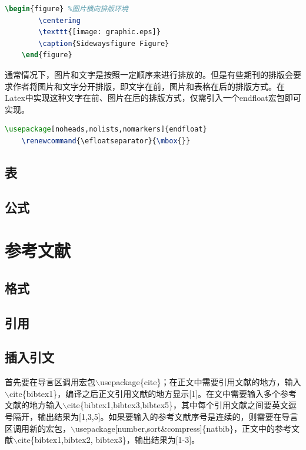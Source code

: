 \documentclass[12pt]{book}
\begin{document}
\begin{lstlisting}[language=tex]
	\begin{figure} %图片横向排版环境
		\centering 
		\texttt{[image: graphic.eps]} 
		\caption{Sidewaysfigure Figure} 
	\end{figure}
\end{lstlisting}

通常情况下，图片和文字是按照一定顺序来进行排放的。但是有些期刊的排版会要求作者将图片和文字分开排版，即文字在前，图片和表格在后的排版方式。在Latex中实现这种文字在前、图片在后的排版方式，仅需引入一个endfloat宏包即可实现。

\begin{lstlisting}[language=tex]
	\usepackage[noheads,nolists,nomarkers]{endfloat}
	\renewcommand{\efloatseparator}{\mbox{}}
\end{lstlisting}

\section{表}

\section{公式}

\chapter{参考文献}

\section{格式}

\section{引用}

\section{插入引文}

首先要在导言区调用宏包$\backslash$usepackage\{cite\}；在正文中需要引用文献的地方，输入$\backslash$cite\{bibtex1\}，编译之后正文引用文献的地方显示[1]。在文中需要输入多个参考文献的地方输入$\backslash$cite\{bibtex1,bibtex3,bibtex5\}，其中每个引用文献之间要英文逗号隔开，输出结果为[1,3,5]。如果要输入的参考文献序号是连续的，则需要在导言区调用新的宏包，$\backslash$usepackage[number,sort\&compress]\{natbib\}，正文中的参考文献$\backslash$cite\{bibtex1,bibtex2, bibtex3\}，输出结果为[1-3]。
\end{document}
